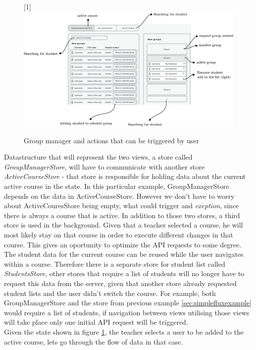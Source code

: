 \begin{figure}[h]
  \scalebox{1}[1]{{\includegraphics[width=1\linewidth]{graphics/advancedgroupmanager.png}}}
  \caption{Group manager and actions that can be triggered by user}
  \label{fig:advancedgroupmanager}
\end{figure}

Datastructure that will represent the two views, a store called \emph{GroupManagerStore}, will have to communicate with another store \emph{ActiveCourseStore} - that store is responsible for holding data about the current active course in the state. In this particular example, GroupManagerStore depends on the data in ActiveCourseStore. However we don't have to worry about ActiveCouresStore being empty, what could trigger and \emph{exeption}, since there is always a course that is active. In addition to those two stores, a third store is used in the background. Given that a teacher selected a course, he will most likely stay on that course in order to execute different changes in that course. This gives an oportunity to optimize the API requests to some degree. The student data for the current course can be reused  while the user navigates within a course. Therefore there is a separate store for student list called \emph{StudentsStore}, other stores that require a list of students will no longer have to request this data from the server, given that another store already requested student lists and the user didn't switch the course. For example, both GroupManagerStore and the store from previous example \ref{sec:simplefluxexample} would require a list of students, if navigation between views utilising those views will take place only one initial API request will be triggered.
\\Given the state shown in figure \ref{fig:advancedgroupmanager}, the teacher selects a user to be added to the active course, lets go through the flow of data in that case.

